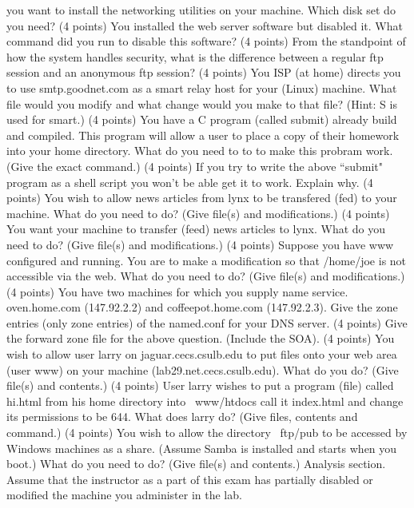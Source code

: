 you want to install the networking utilities on your machine.
Which disk set do you need?
\vskip 0.5in
\ques
(4 points)
You installed the web server software but disabled it.
What command did you run to disable this software?
\vskip 0.5in
\vfill\eject
\ques
(4 points)
From the standpoint of how the system handles security,
what is the difference between a regular ftp session
and an anonymous ftp session?
\vskip 2.0in
\ques
(4 points)
You ISP (at home) directs you to use
{\ltt{}smtp.goodnet.com} as a smart relay host for
your (Linux) machine.
What file would you modify and what change would you make to that file?
(Hint: {\ltt{}S} is used for smart.)
\vskip 1.0in
\ques
(4 points)
You have a C program (called {\ltt{}submit}) already build and compiled.
This program will allow a user to place a copy of their homework
into your home directory.
What do you need to to to make this probram work.
(Give the exact command.)
\vskip 0.8in
\ques
(4 points)
If you try to write the above ``submit" program as a shell script
you won't be able get it to work.
Explain why.
\vskip 1.2in
\ques
(4 points)
You wish to allow news articles from {\ltt{}lynx} to be transfered (fed)
to your machine.
What do you need to do? (Give file(s) and modifications.)
\vskip 1.4in
\vfill\eject
\ques
(4 points)
You want your machine to transfer (feed) news articles to {\ltt{}lynx}.
What do you need to do?
(Give file(s) and modifications.)
\vskip 1.9in
\ques
(4 points)
Suppose you have www configured and running. You are to make a
modification so that {\ltt{}/home/joe} is not accessible
via the web.
What do you need to do? (Give file(s) and modifications.)
\vskip 1.5in
\ques
(4 points)
You have two machines for which you supply name service.
{\ltt{}oven.home.com} (147.92.2.2) and 
{\ltt{}coffeepot.home.com} (147.92.2.3).
Give the zone entries (only zone entries) of the {\ltt{}named.conf}
for your DNS server.
\vfill
\eject
\ques
(4 points)
Give the forward zone file for the above question. (Include the SOA).
\vskip 2.8in
\ques
(4 points)
You wish to allow user {\ltt{}larry} on {\ltt{}jaguar.cecs.csulb.edu}
to put files onto your web area (user {\ltt{}www}) on 
your machine ({\ltt{}lab29.net.cecs.csulb.edu}).
What do you do?
(Give file(s) and contents.)
\vskip 1.0in
\ques
(4 points)
User {\ltt{}larry} wishes to put a program (file) called 
{\ltt{}hi.html} from his home directory into {\ltt{}~www/htdocs}
call it {\ltt{}index.html} and change its permissions to
be {\ltt{}644}.
What does {\ltt{}larry} do? (Give files, contents and command.)
\vskip 1.6in
\ques
(4 points)
You wish to allow the directory {\ltt{}~ftp/pub} to be accessed by
Windows machines as a share. (Assume Samba is installed and 
starts when you boot.)
What do you need to do?
(Give file(s) and contents.)
\vskip 1.3in
\vfill\eject
Analysis section. Assume that the instructor as a part of this exam
has partially disabled or modified the machine you administer in the lab.

